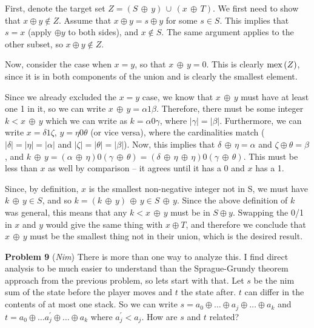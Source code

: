 \vskip 0.08in  First, denote the
target set $Z = \left(S \, \oplus \, y\right) \, \cup \, \left(x \, \oplus \, T\right)$.
We first need to show that $x \oplus y \notin Z$.  Assume
that $x \oplus y = s \oplus y$ for some $s \in S$.  This implies that $s = x$
(apply $\oplus y$ to both sides), and $x \notin S$.  The same argument
applies to the other subset, so $x \oplus y \notin Z$.

Now, consider the case when $x = y$, so that $x \, \oplus \, y = 0$.  This is clearly 
${\rm mex}\left(Z\right)$,
since it is in both components of the union and is clearly the smallest element.

Since we already excluded the $x = y$ case,
we know that $x \, \oplus \, y$ must have at least one 1 in it, so
we can write $x \, \oplus \, y = \alpha 1 \beta$.  Therefore, there must be
some integer $k < x \, \oplus \, y$ which we can write as
$k = \alpha 0 \gamma$, where $| \gamma | = | \beta |$.  Furthermore,
we can write $x = \delta 1 \zeta$, $y = \eta 0 \theta$ (or vice versa),
where the cardinalities match ($|\delta| = | \eta | = | \alpha |$
and  $|\zeta| = |\theta| = |\beta|$).  Now, this implies that $\delta \, \oplus \, \eta = \alpha$
and $\zeta \oplus \theta = \beta$, and $k \, \oplus \, y = \left(\alpha \, \oplus \, \eta\right)
0 \left(\gamma \, \oplus \, \theta\right) = \left(\delta \, \oplus \, \eta \, \oplus \, \eta\right)
0 \left(\gamma \, \oplus \, \theta\right)$.  This must be less than $x$ as well by
comparison -- it agrees until it has a 0 and $x$ has a 1.  

Since, by definition,
$x$ is the smallest non-negative integer not in S, we must have $k \, \oplus \, y \in S$,
and so $k  = \left(k \, \oplus \, y\right) \, \oplus \, y \in S \, \oplus \, y$.
Since the above definition of $k$ was general, this means that any $k < x \, \oplus \, y$
must be in $S \oplus y$.  Swapping the 0/1 in $x$ and $y$ would give the same
thing with $x \oplus T$, and therefore we conclude that $x \, \oplus \, y$
must be the smallest thing not in their union, which is the desired result.

\vskip 0.08in {\bf Problem 9} ({\it Nim}) \hfil\break
There is more than one way to analyze this.  I find direct
analysis to be much easier to understand than the Sprague-Grundy
theorem approach from the previous problem, so lets start with that.
Let $s$ be the nim sum of the state before the player moves
and $t$ the state after.  $t$ can differ in the contents of at most
one stack.  So we can write 
$s = a_0 \oplus \ldots \oplus a_j \oplus \ldots \oplus a_k$ and 
$t = a_0 \oplus \ldots a^{\prime}_j \oplus \ldots \oplus a_k$ 
where $a^{\prime}_j < a_j$.  How are $s$ and $t$ related?

